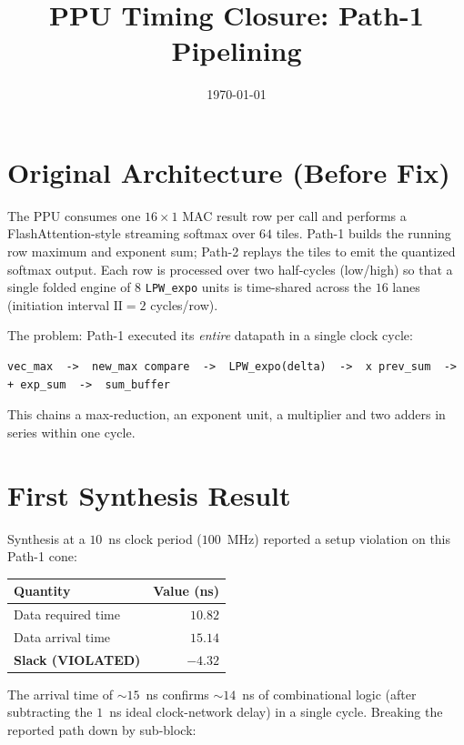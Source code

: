 \documentclass[11pt]{article}
\title{PPU Timing Closure: Path-1 Pipelining}
\author{}
\date{\today}
\begin{document}
\maketitle

\section{Original Architecture (Before Fix)}

The PPU consumes one $16\times1$ MAC result row per call and performs a
FlashAttention-style streaming softmax over $64$ tiles. Path-1 builds the
running row maximum and exponent sum; Path-2 replays the tiles to emit the
quantized softmax output. Each row is processed over two half-cycles (low/high)
so that a single folded engine of $8$ \texttt{LPW\_expo} units is time-shared
across the $16$ lanes (initiation interval $\text{II}=2$ cycles/row).

The problem: Path-1 executed its \emph{entire} datapath in a single clock cycle:

\begin{lstlisting}
vec_max  ->  new_max compare  ->  LPW_expo(delta)  ->  x prev_sum  ->  + exp_sum  ->  sum_buffer
\end{lstlisting}

This chains a max-reduction, an exponent unit, a multiplier and two adders in
series within one cycle.

\section{First Synthesis Result}

Synthesis at a $10$~ns clock period ($100$~MHz) reported a setup violation on
this Path-1 cone:

\begin{center}
\begin{tabular}{lr}
\toprule
Quantity & Value (ns) \\
\midrule
Data required time & $10.82$ \\
Data arrival time  & $15.14$ \\
\midrule
\textbf{Slack (VIOLATED)} & $\mathbf{-4.32}$ \\
\bottomrule
\end{tabular}
\end{center}

The arrival time of $\sim15$~ns confirms $\sim14$~ns of combinational logic
(after subtracting the $1$~ns ideal clock-network delay) in a single cycle.
Breaking the reported path down by sub-block:
\end{document}
